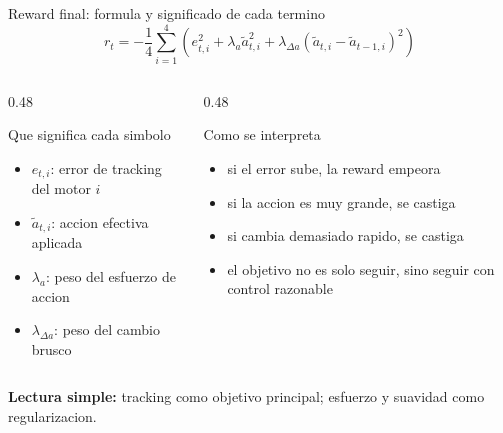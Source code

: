 \documentclass[aspectratio=169,11pt]{beamer}
\begin{document}
\begin{frame}{Reward final: formula y significado de cada termino}
\small
\[
r_t = -\frac{1}{4}\sum_{i=1}^{4}\left(e_{t,i}^{2} + \lambda_a \tilde{a}_{t,i}^{2} + \lambda_{\Delta a}(\tilde{a}_{t,i}-\tilde{a}_{t-1,i})^2\right)
\]

\begin{columns}[T]
\begin{column}{0.48\linewidth}
\begin{block}{Que significa cada simbolo}
\begin{itemize}
\item \(e_{t,i}\): error de tracking del motor \(i\)
\item \(\tilde{a}_{t,i}\): accion efectiva aplicada
\item \(\lambda_a\): peso del esfuerzo de accion
\item \(\lambda_{\Delta a}\): peso del cambio brusco
\end{itemize}
\end{block}
\end{column}
\begin{column}{0.48\linewidth}
\begin{block}{Como se interpreta}
\begin{itemize}
\item si el error sube, la reward empeora
\item si la accion es muy grande, se castiga
\item si cambia demasiado rapido, se castiga
\item el objetivo no es solo seguir, sino seguir con control razonable
\end{itemize}
\end{block}
\end{column}
\end{columns}

\vspace{0.15cm}
\small
\textbf{Lectura simple:} tracking como objetivo principal; esfuerzo y suavidad como regularizacion.
\end{frame}
\end{document}
